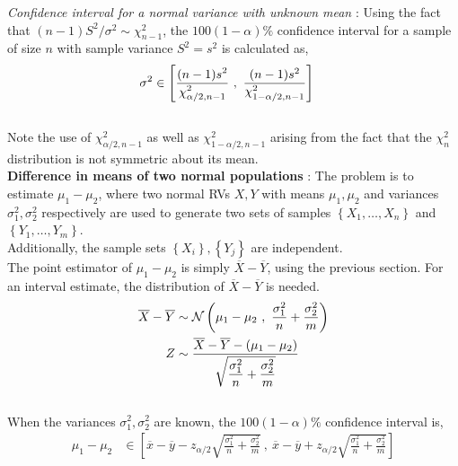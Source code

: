 \textit{Confidence interval for a normal variance with unknown mean} : Using the fact that $ (n-1) S^2 / \sigma^2 \sim \chi^2_{n-1} $, the $ 100(1-\alpha) \% $ confidence interval for a sample of size $ n $ with sample variance $ S^2 = s^2 $ is calculated as, \\

\begin{align}
	\sigma^2 &\in \left[\frac{\displaystyle (n-1)s^2}{\displaystyle \chi^2_{\alpha/2, n-1}}\ ,\ \frac{(n-1)s^2}{\chi^2_{1 - \alpha/2, n-1}}\right]
\end{align}\\

Note the use of $ \chi^2_{\alpha/2, n-1} $ as well as $ \chi^2_{1 - \alpha/2, n-1} $ arising from the fact that the $ \chi_n^2 $ distribution is not symmetric about its mean. \\

\textbf{Difference in means of two normal populations} : The problem is to estimate $ \mu_1 - \mu_2 $, where two normal RVs $ X, Y $ with means $ \mu_1, \mu_2 $ and variances $ \sigma_1^2, \sigma_2^2 $ respectively are used to generate two sets of samples $ \left\{X_1, \dots, X_n\right\} $ and $ \left\{Y_1, \dots, Y_m\right\} $. \\

Additionally, the sample sets $ \left\{X_i\right\}, \left\{Y_j\right\} $ are independent.\\

The point estimator of $ \mu_1 - \mu_2 $ is simply $ \overline{X} - \overline{Y} $, using the previous section. For an interval estimate, the distribution of $ \overline{X} - \overline{Y} $ is needed. \\

\begin{align}
	\overline{X} - \overline{Y} &\sim \mathcal{N}\left(\mu_1 - \mu_2\ ,\ \frac{\sigma_1^2}{n} + \frac{\sigma_2^2}{m}\right) \nonumber \\
	Z &\sim \frac{\displaystyle \overline{X} - \overline{Y} - (\mu_1 - \mu_2)}{\displaystyle \sqrt{\frac{\sigma_1^2}{n} + \frac{\sigma_2^2}{m}}} 
\end{align}\\

When the variances $ \sigma_1^2, \sigma_2^2 $ are known, the $ 100(1-\alpha)\% $ confidence interval is, \\

\begin{align}
	\mu_1 - \mu_2 &\in \left[ \overline{x} - \overline{y} - z_{\alpha / 2} \sqrt{\frac{\sigma_1^2}{n} + \frac{\sigma_2^2}{m}}\ ,\ \overline{x} - \overline{y} + z_{\alpha / 2} \sqrt{\frac{\sigma_1^2}{n} + \frac{\sigma_2^2}{m}} \right] 
\end{align}\\


